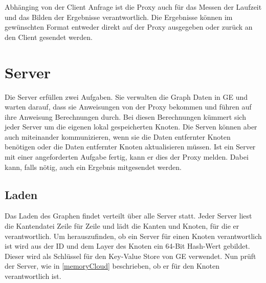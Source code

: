 Abhänging von der Client Anfrage ist die Proxy auch für das Messen der Laufzeit und das Bilden der Ergebnisse verantwortlich. Die Ergebnisse können im gewünschten Format entweder direkt auf der Proxy ausgegeben
oder zurück an den Client gesendet werden.

\section{Server}

Die Server erfüllen zwei Aufgaben. Sie verwalten die Graph Daten in GE und warten darauf, dass sie Anweisungen von der Proxy bekommen und führen auf ihre Anweisung Berechnungen durch. Bei diesen Berechnungen kümmert sich jeder Server 
um die eigenen lokal gespeicherten Knoten. Die Serven können aber auch miteinander kommunizieren, wenn sie die Daten entfernter Knoten benötigen oder die Daten entfernter Knoten
aktualisieren müssen.
Ist ein Server mit einer angeforderten Aufgabe fertig, kann er dies der Proxy melden. Dabei kann, falls nötig, auch ein Ergebnis mitgesendet werden.


\subsection{Laden}

Das Laden des Graphen findet verteilt über alle Server statt. Jeder Server liest die Kantendatei Zeile für Zeile und lädt die Kanten und Knoten, für die er verantwortlich.
Um herauszufinden, ob ein Server für einen Knoten verantwortlich ist wird aus der ID und dem Layer des Knoten ein 64-Bit Hash-Wert gebildet. Dieser wird als Schlüssel für den Key-Value Store von GE verwendet.
Nun prüft der Server, wie in \ref{memoryCloud} beschrieben, ob er für den Knoten verantwortlich ist.

